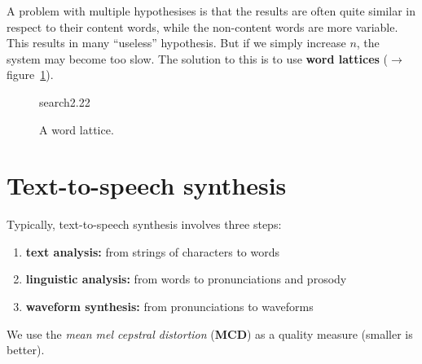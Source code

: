 A problem with multiple hypothesises is that the results are often quite similar in respect to their content words, while the non-content words are more variable. This results in many ``useless'' hypothesis. But if we simply increase $n$, the system may become too slow. The solution to this is to use \textbf{word lattices} ($\to$ figure~\ref{fig:wordLattice}).
\begin{figure}[htb]
    \begin{minipage}{\linewidth}
        \vspace{3cm}
        \hfill \scriptsize search2.22
    \end{minipage}
    \caption{\label{fig:wordLattice} A word lattice.}
\end{figure}

\newpage

\section{Text-to-speech synthesis}

Typically, text-to-speech synthesis involves three steps:
\begin{enumerate}
    \item \textbf{text analysis:} from strings of characters to words
    \item \textbf{linguistic analysis:} from words to pronunciations and prosody
    \item \textbf{waveform synthesis:} from pronunciations to waveforms
\end{enumerate}

We use the \textit{mean mel cepstral distortion} (\textbf{MCD}) as a quality measure (smaller is better).

